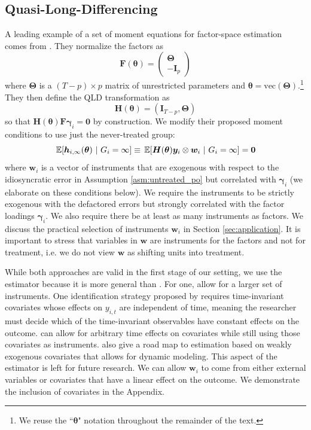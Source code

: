 \documentclass[12pt]{article}
\begin{document}
\subsection{Quasi-Long-Differencing}\label{subsection:QLD}
A leading example of a set of moment equations for factor-space estimation comes from \citet{Ahn_Lee_Schmidt_2013}. They normalize the factors as 
\begin{equation}
  \bm{F}(\bm \theta) = 
  \begin{pmatrix}
    \bm \Theta\\
    -\bm I_p
  \end{pmatrix}
\end{equation}
where $\bm \Theta$ is a $(T-p) \times p$ matrix of unrestricted parameters and $\bm \theta = \text{vec}(\bm \Theta)$.\footnote{We reuse the ``$\bm \theta$" notation throughout the remainder of the text.} They then define the QLD transformation as 
\begin{equation}
  \bm H(\bm \theta) = (\bm I_{T-p}, \bm \Theta)
\end{equation}
so that $\bm H(\bm \theta) \bm{F} \bm \gamma_i = \bm 0$ by construction. We modify their proposed moment conditions to use just the never-treated group:
\begin{equation}\label{eq:factor_moments}
    \expec{\bm h_{i,\infty}(\bm \theta)}{G_i = \infty} \equiv \expec{\bm H(\bm \theta) \bm y_i \otimes \bm w_i}{G_i = \infty} = \bm 0
\end{equation}
where $\bm w_i$ is a vector of instruments that are exogenous with respect to the idiosyncratic error in Assumption \ref{asm:untreated_po} but correlated with $\bm \gamma_i$ (we elaborate on these conditions below). We require the instruments to be strictly exogenous with the defactored errors but strongly correlated with the factor loadings $\bm \gamma_i$. We also require there be at least as many instruments as factors. 
We discuss the practical selection of instruments $\bm w_i$ in Section \ref{sec:application}. 
It is important to stress that variables in $\bm w$ are instruments for the factors and not for treatment, i.e. we do not view $\bm{w}$ as shifting units into treatment.

While both approaches are valid in the first stage of our setting, we use the \citet{Ahn_Lee_Schmidt_2013} estimator because it is more general than \citet{Callaway_Karami_2020}. For one, \citet{Ahn_Lee_Schmidt_2013} allow for a larger set of instruments. One identification strategy proposed by \citet{Callaway_Karami_2020} requires time-invariant covariates whose effects on $y_{i,t}$ are independent of time, meaning the researcher must decide which of the time-invariant observables have constant effects on the outcome. \citet{Ahn_Lee_Schmidt_2013} can allow for arbitrary time effects on covariates while still using those covariates as instruments. \citet{Ahn_Lee_Schmidt_2013} also give a road map to estimation based on weakly exogenous covariates that allows for dynamic modeling. This aspect of the estimator is left for future research. We can allow $\bm w_i$ to come from either external variables or covariates that have a linear effect on the outcome. We demonstrate the inclusion of covariates in the Appendix. 
\end{document}

